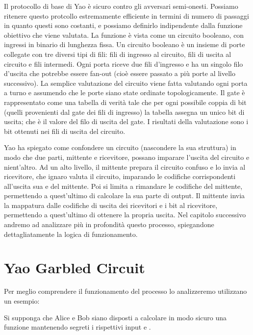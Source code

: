 \documentclass[
]{book}
\begin{document}
Il protocollo di base di Yao è sicuro contro gli avversari semi-onesti. Possiamo ritenere questo protcollo estremamente efficiente in termini di numero di passaggi in quanto questi sono costanti, e possiamo definirlo indipendente dalla funzione obiettivo che viene valutata. La funzione è vista come un circuito booleano, con ingressi in binario di lunghezza fissa. Un circuito booleano è un insieme di porte collegate con tre diversi tipi di fili: fili di ingresso al circuito, fili di uscita al circuito e fili intermedi. Ogni porta riceve due fili d'ingresso e ha un singolo filo d'uscita che potrebbe essere fan-out (cioè essere passato a più porte al livello successivo). La semplice valutazione del circuito viene fatta valutando ogni porta a turno e assumendo che le porte siano state ordinate topologicamente. Il gate è rappresentato come una tabella di verità tale che per ogni possibile coppia di bit (quelli provenienti dal gate dei fili di ingresso) la tabella assegna un unico bit di uscita; che è il valore del filo di uscita del gate. I risultati della valutazione sono i bit ottenuti nei fili di uscita del circuito.\citep{yao1982protocols}

\newpage

Yao ha spiegato come confondere un circuito (nascondere la sua struttura) in modo che due parti, mittente e ricevitore, possano imparare l'uscita del circuito e nient'altro. Ad un alto livello, il mittente prepara il circuito confuso e lo invia al ricevitore, che ignaro valuta il circuito, imparando le codifiche corrispondenti all'uscita sua e del mittente. Poi si limita a rimandare le codifiche del mittente, permettendo a quest'ultimo di calcolare la sua parte di output. Il mittente invia la mappatura dalle codifiche di uscita dei ricevitori e i bit al ricevitore, permettendo a quest'ultimo di ottenere la propria uscita.
Nel capitolo successivo andremo ad analizzare più in profondità questo processo, spiegandone dettagliatamente la logica di funzionamento. \citep{Venturi2012}

\hypertarget{yao-garbled-circuit}{%
\chapter{Yao Garbled Circuit}\label{yao-garbled-circuit}}

Per meglio comprendere il funzionamento del processo lo analizzeremo utilizzano un esempio:

Si supponga che Alice e Bob siano disposti a calcolare in modo sicuro una funzione mantenendo segreti i rispettivi input e .
\end{document}
